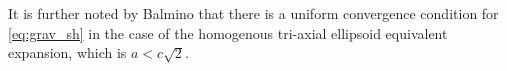 It is further noted by Balmino \cite{Geodesy1994} that there is a uniform
convergence condition for \autoref{eq:grav_sh} in the case of the homogenous
tri-axial ellipsoid equivalent expansion, which is $a<c\sqrt{2}$.






